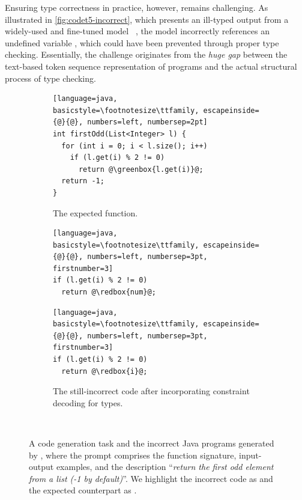 Ensuring type correctness in practice, however, remains challenging. 
As illustrated in \autoref{fig:codet5-incorrect}, which presents an ill-typed output from a widely-used and fine-tuned model ~\cite{DBLP:conf/emnlp/0034WJH21}, the model incorrectly references an undefined variable , which could have been prevented through proper type checking.
Essentially, the challenge originates from the \textit{huge gap} between the text-based token sequence representation of programs and the actual structural process of type checking.

\begin{figure}
\hfill
    \begin{subfigure}{0.45\textwidth}
        \begin{lstlisting}[language=java, basicstyle=\footnotesize\ttfamily, escapeinside={@}{@}, numbers=left, numbersep=2pt]
int firstOdd(List<Integer> l) {
  for (int i = 0; i < l.size(); i++)
    if (l.get(i) % 2 != 0)
      return @\greenbox{l.get(i)}@;
  return -1;
}
        \end{lstlisting}
\vspace{-0.5em}
\caption{The expected function.}
\vspace{1em}
        \label{fig:codet5-correct}
    \end{subfigure}
    \hfill
    \begin{subfigure}{0.45\textwidth}
\centering 
\begin{minipage}{0.6\textwidth}
\begin{lstlisting}[language=java, basicstyle=\footnotesize\ttfamily, escapeinside={@}{@}, numbers=left, numbersep=3pt, firstnumber=3]
if (l.get(i) % 2 != 0)
  return @\redbox{num}@;
\end{lstlisting}
\end{minipage}
\vspace{-0.5em}
\caption{The ill-typed code generated by }
\label{fig:codet5-incorrect}
\vspace{1em}
\begin{minipage}{0.6\textwidth}
\begin{lstlisting}[language=java, basicstyle=\footnotesize\ttfamily, escapeinside={@}{@}, numbers=left, numbersep=3pt, firstnumber=3]
if (l.get(i) % 2 != 0)
  return @\redbox{i}@;
\end{lstlisting}
\end{minipage}
\vspace{-0.5em}
\caption{The still-incorrect code after incorporating constraint decoding for types.}
        \label{fig:codet5-constraint-incorrect}
    \end{subfigure}
\hfill\ 
\caption{A code generation task and the incorrect Java programs generated by , where the prompt comprises the function signature, input-output examples, and the description ``\emph{return the first odd element from a list (-1 by default)}''. We highlight the incorrect code as  and the expected counterpart as .}
    \label{fig:intro-sample}
\end{figure}

